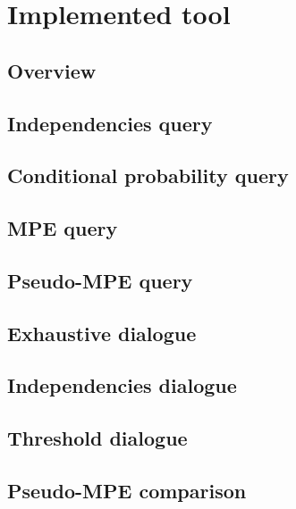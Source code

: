 \section{Implemented tool}
\subsection{Overview}

\subsection{Independencies query}

\subsection{Conditional probability query}

\subsection{MPE query}

\subsection{Pseudo-MPE query}

\subsection{Exhaustive dialogue}

\subsection{Independencies dialogue}

\subsection{Threshold dialogue}

\subsection{Pseudo-MPE comparison}